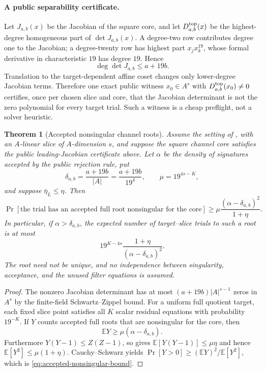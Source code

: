 \documentclass[11pt]{article}
\newtheorem{theorem}{Theorem}
\begin{document}
\paragraph{A public separability certificate.}
Let $J_{a,b}(x)$ be the Jacobian of the square core, and let
$D_{a,b}^{\rm top}(x)$ be the highest-degree homogeneous part of
$\det J_{a,b}(x)$.  A degree-two row contributes degree one to the Jacobian;
a degree-twenty row has highest part $x_jx_k^{19}$, whose formal derivative in
characteristic $19$ has degree $19$.  Hence
\begin{equation}\label{eq:channel-jacobian-degree}
 \deg\det J_{a,b}\le a+19b.
\end{equation}
Translation to the target-dependent affine coset changes only lower-degree
Jacobian terms.  Therefore one exact public witness
$x_0\in A^s$ with $D_{a,b}^{\rm top}(x_0)\ne0$ certifies, once per chosen
slice and core, that the Jacobian determinant is not the zero polynomial for
every target trial.  Such a witness is a cheap preflight, not a solver
heuristic.

\begin{theorem}[Accepted nonsingular channel roots]
\label{thm:accepted-nonsingular-singleton}
Assume the setting of , with an $A$-linear slice
of $A$-dimension $s$, and suppose the square channel core satisfies the public
leading-Jacobian certificate above.  Let $\alpha$ be the density of signatures
accepted by the public rejection rule, put
\[
 \delta_{a,b}=\frac{a+19b}{|A|}=\frac{a+19b}{19^4},
 \qquad \mu=19^{4s-K},
\]
and suppose $\bar\eta_L\le\eta$.  Then
\begin{equation}\label{eq:accepted-nonsingular-bound}
 \Pr[\text{the trial has an accepted full root nonsingular for the core}]
 \ge \mu\frac{(\alpha-\delta_{a,b})^2}{1+\eta}.
\end{equation}
In particular, if $\alpha>\delta_{a,b}$, the expected number of target--slice
trials to such a root is at most
\begin{equation}\label{eq:channel-retry}
 19^{K-4s}\frac{1+\eta}{(\alpha-\delta_{a,b})^2}.
\end{equation}
The root need not be unique, and no independence between singularity,
acceptance, and the unused filter equations is assumed.
\end{theorem}

\begin{proof}
The nonzero Jacobian determinant has at most
$(a+19b)|A|^{s-1}$ zeros in $A^s$ by the finite-field Schwartz--Zippel bound.
For a uniform full quotient target, each fixed slice point satisfies all $K$
scalar residual equations with probability $19^{-K}$.  If $Y$ counts accepted
full roots that are nonsingular for the core, then
\[
 \mathbb EY\ge\mu(\alpha-\delta_{a,b}).
\]
Furthermore $Y(Y-1)\le Z(Z-1)$, so
 gives
$\mathbb E[Y(Y-1)]\le\mu\eta$ and hence
$\mathbb E[Y^2]\le\mu(1+\eta)$.  Cauchy--Schwarz yields
$\Pr[Y>0]\ge(\mathbb EY)^2/\mathbb E[Y^2]$, which is
\eqref{eq:accepted-nonsingular-bound}.
\end{proof}
\end{document}
